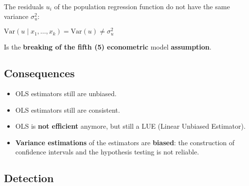 \documentclass[10pt, a4paper, landscape]{extarticle}
\newcommand{\Var}{\mathrm{Var}}
\begin{document}
\begin{multicols}{3}
The residuals $u_i$ of the population regression function do not have the same variance $\sigma^2_u$:

\begin{center}
	$\Var(u \mid x_1, \ldots, x_k) = \Var(u) \neq \sigma^2_u$
\end{center}

Is the \textbf{breaking of the fifth (5) econometric} model \textbf{assumption}.

\subsection*{Consequences}

\begin{itemize}[leftmargin=*]
	\item OLS estimators still are unbiased.
	\item OLS estimators still are consistent.
	\item OLS is \textbf{not efficient} anymore, but still a LUE (Linear Unbiased Estimator).
	\item \textbf{Variance estimations} of the estimators are \textbf{biased}: the construction of confidence intervals and the hypothesis testing is not reliable.
\end{itemize}

\subsection*{Detection}


\end{multicols}
\end{document}
